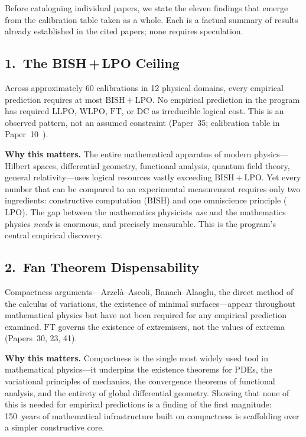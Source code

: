 \documentclass[11pt,a4paper]{report}
\theoremstyle{plain}
\theoremstyle{definition}
\theoremstyle{remark}
\newcommand{\BISH}{\mathrm{BISH}}
\newcommand{\LLPO}{\mathrm{LLPO}}
\newcommand{\WLPO}{\mathrm{WLPO}}
\newcommand{\LPO}{\mathrm{LPO}}
\newcommand{\FT}{\mathrm{FT}}
\newcommand{\DC}{\mathrm{DC}}
\begin{document}
Before cataloguing individual papers, we state the eleven findings that emerge from the calibration table taken as a whole.  Each is a factual summary of results already established in the cited papers; none requires speculation.

\subsection*{1.\ The BISH\,+\,LPO Ceiling}

Across approximately 60 calibrations in 12 physical domains, every empirical prediction requires at most $\BISH+\LPO$.  No empirical prediction in the program has required $\LLPO$, $\WLPO$, $\FT$, or $\DC$ as irreducible logical cost.  This is an observed pattern, not an assumed constraint (Paper~35; calibration table in Paper~10~\cite{Lee2026P10}).

\medskip\noindent
\textbf{Why this matters.}\quad
The entire mathematical apparatus of modern physics---Hilbert spaces, differential geometry, functional analysis, quantum field theory, general relativity---uses logical resources vastly exceeding $\BISH+\LPO$.  Yet every number that can be compared to an experimental measurement requires only two ingredients: constructive computation ($\BISH$) and one omniscience principle ($\LPO$).  The gap between the mathematics physicists \emph{use} and the mathematics physics \emph{needs} is enormous, and precisely measurable.  This is the program's central empirical discovery.

\subsection*{2.\ Fan Theorem Dispensability}

Compactness arguments---Arzel\`a--Ascoli, Banach--Alaoglu, the direct method of the calculus of variations, the existence of minimal surfaces---appear throughout mathematical physics but have not been required for any empirical prediction examined.  $\FT$ governs the existence of extremisers, not the values of extrema (Papers~30, 23, 41).

\medskip\noindent
\textbf{Why this matters.}\quad
Compactness is the single most widely used tool in mathematical physics---it underpins the existence theorems for PDEs, the variational principles of mechanics, the convergence theorems of functional analysis, and the entirety of global differential geometry.  Showing that none of this is needed for empirical predictions is a finding of the first magnitude: 150~years of mathematical infrastructure built on compactness is scaffolding over a simpler constructive core.
\end{document}
